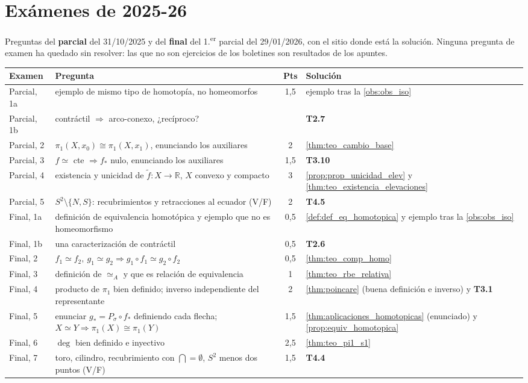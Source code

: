 \section{Exámenes de 2025-26}

Preguntas del \textbf{parcial} del 31/10/2025 y del \textbf{final} del 1.\textsuperscript{er} parcial del 29/01/2026, con el sitio donde está la solución. Ninguna pregunta de examen ha quedado sin resolver: las que no son ejercicios de los boletines son resultados de los apuntes.

\begin{center}
\renewcommand{\arraystretch}{1.15}
\begin{tabular}{|l|p{6.3cm}|c|p{4.4cm}|}
\hline
\textbf{Examen} & \textbf{Pregunta} & \textbf{Pts} & \textbf{Solución} \\ \hline
Parcial, 1a & ejemplo de mismo tipo de homotopía, no homeomorfos & \multirow{2}{*}{1,5} & ejemplo tras la \cref{obs:obs_iso} \\
Parcial, 1b & contráctil $\Rightarrow$ arco-conexo, ¿recíproco? & & \textbf{T2.7} \\ \hline
Parcial, 2 & $\pi_1(X,x_0) \cong \pi_1(X,x_1)$, enunciando los auxiliares & 2 & \cref{thm:teo_cambio_base} \\ \hline
Parcial, 3 & $f \simeq$ cte $\Rightarrow f_*$ nulo, enunciando los auxiliares & 1,5 & \textbf{T3.10} \\ \hline
Parcial, 4 & existencia y unicidad de $\tilde f \colon X \to \mathbb{R}$, $X$ convexo y compacto & 3 & \cref{prop:prop_unicidad_elev} y \cref{thm:teo_existencia_elevaciones} \\ \hline
Parcial, 5 & $S^2 \setminus \{N,S\}$: recubrimientos y retracciones al ecuador (V/F) & 2 & \textbf{T4.5} \\ \hline
Final, 1a & definición de equivalencia homotópica y ejemplo que no es homeomorfismo & 0,5 & \cref{def:def_eq_homotopica} y ejemplo tras la \cref{obs:obs_iso} \\ \hline
Final, 1b & una caracterización de contráctil & 0,5 & \textbf{T2.6} \\ \hline
Final, 2 & $f_1 \simeq f_2,\ g_1 \simeq g_2 \Rightarrow g_1 \circ f_1 \simeq g_2 \circ f_2$ & 0,5 & \cref{thm:teo_comp_homo} \\ \hline
Final, 3 & definición de $\simeq_A$ y que es relación de equivalencia & 1 & \cref{thm:teo_rbe_relativa} \\ \hline
Final, 4 & producto de $\pi_1$ bien definido; inverso independiente del representante & 2 & \cref{thm:poincare} (buena definición e inverso) y \textbf{T3.1} \\ \hline
Final, 5 & enunciar $g_* = P_\sigma \circ f_*$ definiendo cada flecha; $X \simeq Y \Rightarrow \pi_1(X) \cong \pi_1(Y)$ & 1,5 & \cref{thm:aplicaciones_homotopicas} (enunciado) y \cref{prop:equiv_homotopica} \\ \hline
Final, 6 & $\deg$ bien definido e inyectivo & 2,5 & \cref{thm:teo_pi1_s1} \\ \hline
Final, 7 & toro, cilindro, recubrimiento con $\bigcap = \emptyset$, $S^2$ menos dos puntos (V/F) & 1,5 & \textbf{T4.4} \\ \hline
\end{tabular}
\end{center}
